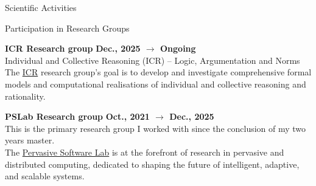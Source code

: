 \documentclass{resume} %
\begin{document}
    \newpage


    \begin{rSection}{Scientific Activities}


        \begin{rSubsection2}{Participation in Research Groups}
            \item\textbf{ ICR Research group }\hfill \textbf{Dec., 2025 $\rightarrow$ Ongoing}
            \\Individual and Collective Reasoning (ICR) -- Logic, Argumentation and Norms
            \\The \href{https://www.uni.lu/fstm-en/research-groups/individual-and-collective-reasoning/}{ICR} research group's goal is to develop and investigate comprehensive formal models and computational realisations of individual and collective reasoning and rationality.


            \item\textbf{ PSLab Research group }\hfill \textbf{Oct., 2021 $\rightarrow$ Dec., 2025}
            \\This is the primary research group I worked with since the conclusion of my two years master.
            \\The \href{https://pslab-unibo.github.io/}{Pervasive Software Lab} is at the forefront of research in pervasive and distributed computing, dedicated to shaping the future of intelligent, adaptive, and scalable systems.
        \end{rSubsection2}




\end{rSection}
\end{document}

